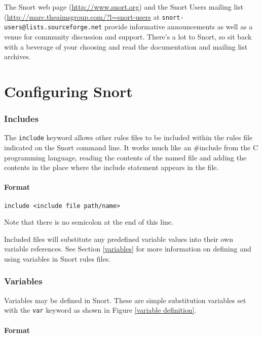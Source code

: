 \documentclass[english]{report}
\newenvironment{note}{
\samepage
    \vspace{10pt}{\textsf{
        {\hspace{7pt}\Huge{$\triangle$\hspace{-12.5pt}{\Large{$^!$}}}}\hspace{5pt}
        {\Large{NOTE}}
    }
    }
   \begin{center}
    \par\vspace{-17pt}

    \begin{lrbox}{\savepar}
    \begin{minipage}[r]{6in}
}
{
    \end{minipage}
    \end{lrbox}
    \fbox{
        \usebox{
            \savepar
	}
    }
    \par\vskip10pt
    \end{center}
}
\newenvironment{note}{
        \begin{rawhtml}
        <p><table border="1"><tr><td><b>
        Note:&nbsp;&nbsp;</b>
        \end{rawhtml}
}{
        \begin{rawhtml}
        </b></td></tr></table></p>
        \end{rawhtml}
}
\begin{document}
The Snort web page (\url{http://www.snort.org}) and the Snort Users mailing
list (\url{http://marc.theaimsgroup.com/?l=snort-users} at
\verb?snort-users@lists.sourceforge.net? provide informative announcements as
well as a venue for community discussion and support. There's a lot to Snort, so
sit back with a beverage of your choosing and read the documentation and
mailing list archives.

\newpage
\chapter{Configuring Snort \label{Configuring Snort}}

\subsection{Includes}

The {\tt include} keyword allows other rules files to be included within the rules
file indicated on the Snort command line. It works much like an \#include from
the C programming language, reading the contents of the named file and adding the contents
in the place where the include statement appears in the file.

\subsubsection{Format}
\begin{verbatim}
include <include file path/name>
\end{verbatim}

\begin{note}
Note that there is no semicolon at the end of this line. 
\end{note}

Included files will
substitute any predefined variable values into their own variable references.
See Section \ref{variables} for more information on defining and
using variables in Snort rules files.

\subsection{Variables \label{variables}}

Variables may be defined in Snort. These are simple substitution variables
set with the {\tt var} keyword as shown in Figure \ref{variable definition}.

\subsubsection{Format}
\end{document}
